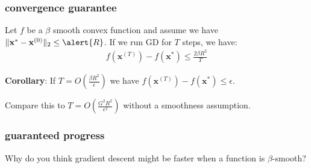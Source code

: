 \documentclass[compress]{beamer}
\newcommand{\bv}[1]{\mathbf{#1}}
\begin{document}
\begin{frame}[t]
	\frametitle{convergence guarantee}
	\begin{theorem}
		Let $f$ be a \alert{$\beta$} smooth convex function and assume we have $\|\bv{x}^{*} - \bv{x}^{(0)}\|_2 \leq \alert{R}$. If we run GD for $T$ steps, we have:
		\begin{align*}
			f(\bv{x}^{(T)}) - f(\bv{x}^*) \leq \frac{2\beta R^2}{T} 
		\end{align*} 
	\end{theorem}
	\textbf{Corollary}: If \alert{$T = O\left(\frac{\beta R^2}{\epsilon}\right)$} we have $f(\bv{x}^{(T)}) - f(\bv{x}^*) \leq \epsilon$.
	
	\vspace{1em}
		Compare this to $T = O\left(\frac{G^2 R^2}{\epsilon^2}\right)$ without  a smoothness assumption.
\end{frame}

\begin{frame}[t]
	\frametitle{guaranteed progress}
	\begin{center}
	Why do you think gradient descent might be faster when a function is $\beta$-smooth?
	\end{center}
\end{frame}
\end{document}
